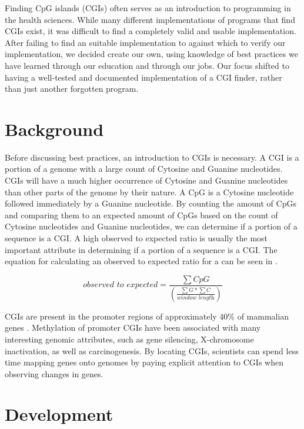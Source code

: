 \documentclass{bioinfo}
\begin{document}
Finding CpG islands (CGIs) often serves as an introduction to
programming in the health sciences. While many different
implementations of programs that find CGIs exist, it was difficult to
find a completely valid and usable implementation. After failing to
find an suitable implementation to against which to verify our
implementation, we decided create our own, using knowledge of best
practices we have learned through our education and through our
jobs. Our focus shifted to having a well-tested and documented
implementation of a CGI finder, rather than just another forgotten
program.
    
\section{Background}

Before discussing best practices, an introduction to CGIs is
necessary. A CGI is a portion of a genome with a large count of
Cytosine and Guanine nucleotides. CGIs will have a much higher
occurrence of Cytosine and Guanine nucleotides than other parts of the
genome by their nature. A CpG is a Cytosine nucleotide followed
immediately by a Guanine nucleotide. By counting the amount of CpGs
and comparing them to an expected amount of CpGs based on the count of
Cytosine nucleotides and Guanine nucleotides, we can determine if a
portion of a sequence is a CGI. A high observed to expected ratio is
usually the most important attribute in determining if a portion of a
sequence is a CGI. The equation for calculating an observed to
expected ratio for a can be seen in .

\begin{equation}
    \textit{observed to expected} = \frac{\sum CpG}{(\frac{\sum G * \sum C}{\textit{window length}})} \label{eq:01}
\end{equation}
      
CGIs are present in the promoter regions of approximately 40\% of
mammalian genes \citep{pmid11891299}. Methylation of promoter CGIs
have been associated with many interesting genomic attributes, such as
gene silencing, X-chromosome inactivation, as well as
carcinogenesis. By locating CGIs, scientists can spend less time
mapping genes onto genomes by paying explicit attention to CGIs when
observing changes in genes.

\section{Development}
\end{document}

